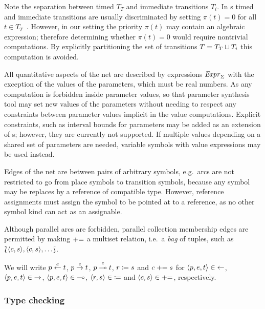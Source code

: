 Note the separation between timed \(T_T\) and immediate transitions \(T_i\). In s timed and immediate transitions are usually discriminated by setting \(\pi(t) = 0\) for all \(t \in T_T\)~\citep{Marsan84gspn}. However, in our setting the priority \(\pi(t)\) may contain an algebraic expression; therefore determining whether \(\pi(t) = 0\) would require nontrivial computations. By explicitly partitioning the set of transitions \(T = T_T \sqcup T_i\) this computation is avoided.
 
All quantitative aspects of the net are described by expressions \(\textrm{\itshape Expr\/}_\Sigma\) with the exception of the values of the parameters, which must be real numbers. As any computation is forbidden inside parameter values, so that parameter synthesis tool may set new values of the parameters without needing to respect any constraints between parameter values implicit in the value computations. Explicit constraints, such as interval bounds for parameters may be added as an extension of s; however, they are currently not supported. If multiple values depending on a shared set of parameters are needed, variable symbols with value expressions may be used instead.

Edges of the net are between pairs of arbitrary symbols, e.g.~arcs are not restricted to go from place symbols to transition symbols, because any symbol may be replaces by a reference of compatible type. However, reference assignments must assign the symbol to be pointed at to a reference, as no other symbol kind can act as an assignable.

Although parallel arcs are forbidden, parallel collection membership edges are permitted by making \({\mathrel{{+}{=}}}\) a multiset relation, i.e.~a \emph{bag} of tuples, such as \(\Lbag \langle c, s \rangle, \langle c, s \rangle, \ldots \Rbag\).

We will write \(p \overset{e}{\leftarrow} t\), \(p \overset{e}{\rightarrow} t\), \(p \overset{e}{\multimap} t\), \(r \coloneq s\) and \(c \mathrel{{+}{=}} s\) for \(\langle p, e, t \rangle \in {\leftarrow}\), \(\langle p, e, t \rangle \in {\rightarrow}\), \(\langle p, e, t \rangle \in {\multimap}\), \(\langle r, s \rangle \in {\coloneq}\) and \(\langle c, s \rangle \in {\mathrel{{+}{=}}}\), respectively.

\subsubsection{Type checking}

